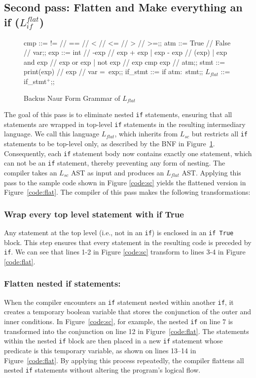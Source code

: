 \subsection{Second pass: Flatten and Make everything an if ($L_{if}^{flat}$)} \label{subsec:flatten}
\begin{figure}[h!]
	\centering
	\begin{bnf}[row{-} = {bg = gray9}]
		cmp ::= != // == // < // <= // > // >=;;
		atm ::= True // False // var;;
		exp ::= int  // -exp // exp + exp 
		| exp - exp // (exp)
		| exp and exp // exp or exp 
		| not exp // exp cmp exp // atm;;
		stmt ::= print(exp) // exp // var = exp;;
		if\_stmt ::= if atm$\colon$ stmt;;
		$L_{flat}$ ::= if\_stmt$^+$;;
	\end{bnf}
	\caption{Backus Naur Form Grammar of $L_{flat}$}
	\label{bnf:flat}
\end{figure}

The goal of this pass is to eliminate nested \texttt{if} statements, ensuring that all statements are wrapped in top-level \texttt{if} statements in the resulting intermediary language. We call this language $L_{flat}$, which inherits from $L_{sc}$ but restricts all \texttt{if} statements to be top-level only, as described by the BNF in Figure~\ref{bnf:flat}. Consequently, each \texttt{if} statement body now contains exactly one statement, which can not be an \texttt{if} statement, thereby preventing any form of nesting. The compiler takes an $L_{sc}$ AST as input and produces an $L_{flat}$ AST. Applying this pass to the sample code shown in Figure \ref{code:sc} yields the flattened version in Figure~\ref{code:flat}. The compiler of this pass makes the following transformations:

\subsubsection{Wrap every top level statement with if True} Any statement at the top level (i.e., not in an \texttt{if}) is enclosed in an \texttt{if True} block. This step ensures that every statement in the resulting code is preceded by \texttt{if}. We can see that lines 1-2 in Figure \ref{code:sc} transform to lines 3-4 in Figure \ref{code:flat}.

\subsubsection{Flatten nested if statements:}
When the compiler encounters an \texttt{if} statement nested within another \texttt{if}, it creates a temporary boolean variable that stores the conjunction of the outer and inner conditions. In Figure~\ref{code:sc}, for example, the nested \texttt{if} on line 7 is transformed into the conjunction on line 12 in Figure~\ref{code:flat}. The statements within the nested \texttt{if} block are then placed in a new \texttt{if} statement whose predicate is this temporary variable, as shown on lines 13–14 in Figure~\ref{code:flat}. By applying this process repeatedly, the compiler flattens all nested \texttt{if} statements without altering the program’s logical flow.

